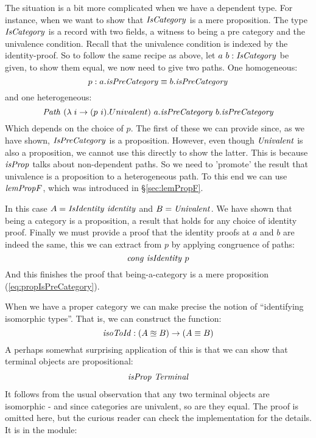 The situation is a bit more complicated when we have a dependent type.
For instance, when we want to show that $\IsCategory$ is a mere
proposition. The type $\IsCategory$ is a record with two fields, a
witness to being a pre category and the univalence condition. Recall
that the univalence condition is indexed by the identity-proof. So to
follow the same recipe as above, let $a\ b \tp \IsCategory$ be given,
to show them equal, we now need to give two paths. One homogeneous:
%
$$
p \tp a.\isPreCategory \equiv b.\isPreCategory
$$
%
and one heterogeneous:
%
$$
\Path\ (\lambda\; i \to (p\ i).Univalent)\ a.\isPreCategory\ b.\isPreCategory
$$
%
Which depends on the choice of $p$. The first of these we can provide since, as
we have shown, $\IsPreCategory$ is a proposition. However, even though
$\Univalent$ is also a proposition, we cannot use this directly to show the
latter. This is because $\isProp$ talks about non-dependent paths. So we need to
'promote' the result that univalence is a proposition to a heterogeneous path.
To this end we can use $\lemPropF$, which was introduced in \S\ref{sec:lemPropF}.

In this case $A = \var{IsIdentity}\ \identity$ and $B = \Univalent$. We have
shown that being a category is a proposition, a result that holds for any choice
of identity proof. Finally we must provide a proof that the identity proofs at
$a$ and $b$ are indeed the same, this we can extract from $p$ by applying
congruence of paths:
%
$$
\congruence\ \isIdentity\ p
$$
%
And this finishes the proof that being-a-category is a mere proposition
(\ref{eq:propIsPreCategory}).

When we have a proper category we can make precise the notion of
``identifying isomorphic types''. That is, we can construct the
function:
%
$$
\isoToId \tp (A \approxeq B) \to (A \equiv B)
$$
%
A perhaps somewhat surprising application of this is that we can show that
terminal objects are propositional:
%
\begin{align}
\label{eq:termProp}
\isProp\ \var{Terminal}
\end{align}
%
It follows from the usual observation that any two terminal objects are
isomorphic - and since categories are univalent, so are they equal. The proof is
omitted here, but the curious reader can check the implementation for the
details. It is in the module:
%
\begin{center}
\end{center}

